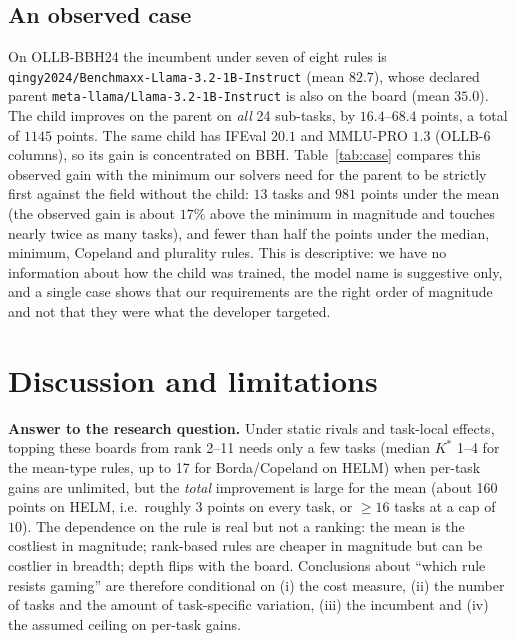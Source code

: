 \documentclass{article}
\theoremstyle{remark}
\begin{document}
\begin{table}[t]
\centering\small
\caption{Fraction of ranks 2--21 on OLLB-6 that can reach first place when each task's gain is capped at the q90/q99/maximum of observed fine-tuning gains.}\label{tab:calibfeas}

\end{table}

\subsection{An observed case}
On OLLB-BBH24 the incumbent under seven of eight rules is \texttt{qingy2024/Benchmaxx-Llama-3.2-1B-Instruct} (mean $82.7$), whose declared parent \texttt{meta-llama/Llama-3.2-1B-Instruct} is also on the board (mean $35.0$). The child improves on the parent on \emph{all} 24 sub-tasks, by $16.4$--$68.4$ points, a total of $1145$ points. The same child has IFEval $20.1$ and MMLU-PRO $1.3$ (OLLB-6 columns), so its gain is concentrated on BBH. Table~\ref{tab:case} compares this observed gain with the minimum our solvers need for the parent to be strictly first against the field without the child: $13$ tasks and $981$ points under the mean (the observed gain is about $17\%$ above the minimum in magnitude and touches nearly twice as many tasks), and fewer than half the points under the median, minimum, Copeland and plurality rules. This is descriptive: we have no information about how the child was trained, the model name is suggestive only, and a single case shows that our requirements are the right order of magnitude and not that they were what the developer targeted.

\begin{table}[t]
\centering\small
\caption{Case study on OLLB-BBH24: observed gain of the incumbent over its parent vs.\ the minimum investment the parent needs for strict first place (cap $g=100$).}\label{tab:case}

\end{table}

\section{Discussion and limitations}
\textbf{Answer to the research question.} Under static rivals and task-local effects, topping these boards from rank 2--11 needs only a few tasks (median $K^\ast$ 1--4 for the mean-type rules, up to 17 for Borda/Copeland on HELM) when per-task gains are unlimited, but the \emph{total} improvement is large for the mean (about 160 points on HELM, i.e.\ roughly $3$ points on every task, or $\ge 16$ tasks at a cap of $10$). The dependence on the rule is real but not a ranking: the mean is the costliest in magnitude; rank-based rules are cheaper in magnitude but can be costlier in breadth; depth flips with the board. Conclusions about ``which rule resists gaming'' are therefore conditional on (i) the cost measure, (ii) the number of tasks and the amount of task-specific variation, (iii) the incumbent and (iv) the assumed ceiling on per-task gains.
\end{document}
